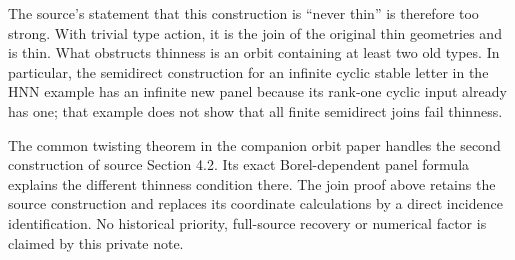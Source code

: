 The source's statement that this construction is ``never thin'' is
therefore too strong. With trivial type action, it is the join of
the original thin geometries and is thin. What obstructs thinness
is an orbit containing at least two old types. In particular, the
semidirect construction for an infinite cyclic stable letter in the
HNN example has an infinite new panel because its rank-one cyclic
input already has one; that example does not show that all finite
semidirect joins fail thinness.

The common twisting theorem in the companion orbit paper handles the
second construction of source Section 4.2. Its exact Borel-dependent
panel formula explains the different thinness condition there. The
join proof above retains the source construction and replaces its
coordinate calculations by a direct incidence identification. No
historical priority, full-source recovery or numerical factor is
claimed by this private note.

